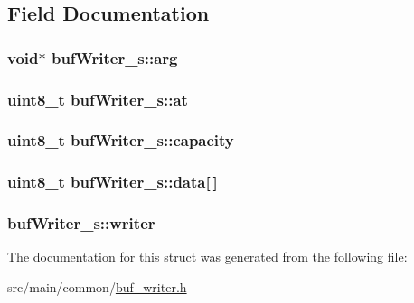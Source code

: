 \subsection{Field Documentation}
\hypertarget{structbufWriter__s_a41345b2ba5d918d545528517839d5f1f}{
\subsubsection[{arg}]{\setlength{\rightskip}{0pt plus 5cm}void$\ast$ buf\+Writer\+\_\+s\+::arg}}\label{structbufWriter__s_a41345b2ba5d918d545528517839d5f1f}
\hypertarget{structbufWriter__s_af913c60f0c740cd94f448c5da97443a6}{
\subsubsection[{at}]{\setlength{\rightskip}{0pt plus 5cm}uint8\+\_\+t buf\+Writer\+\_\+s\+::at}}\label{structbufWriter__s_af913c60f0c740cd94f448c5da97443a6}
\hypertarget{structbufWriter__s_a2e89a9f093be06d8c3173ecf432f7fd4}{
\subsubsection[{capacity}]{\setlength{\rightskip}{0pt plus 5cm}uint8\+\_\+t buf\+Writer\+\_\+s\+::capacity}}\label{structbufWriter__s_a2e89a9f093be06d8c3173ecf432f7fd4}
\hypertarget{structbufWriter__s_ad3753314bf3f04462e55533f6fbfc8f3}{
\subsubsection[{data}]{\setlength{\rightskip}{0pt plus 5cm}uint8\+\_\+t buf\+Writer\+\_\+s\+::data\mbox{[}$\,$\mbox{]}}}\label{structbufWriter__s_ad3753314bf3f04462e55533f6fbfc8f3}
\hypertarget{structbufWriter__s_a0b417f5f34355bd86ba69cbb42fd617a}{
\subsubsection[{writer}]{ buf\+Writer\+\_\+s\+::writer}}\label{structbufWriter__s_a0b417f5f34355bd86ba69cbb42fd617a}


The documentation for this struct was generated from the following file\+:\begin{DoxyCompactItemize}
\item 
src/main/common/\hyperlink{buf__writer_8h}{buf\+\_\+writer.\+h}\end{DoxyCompactItemize}
